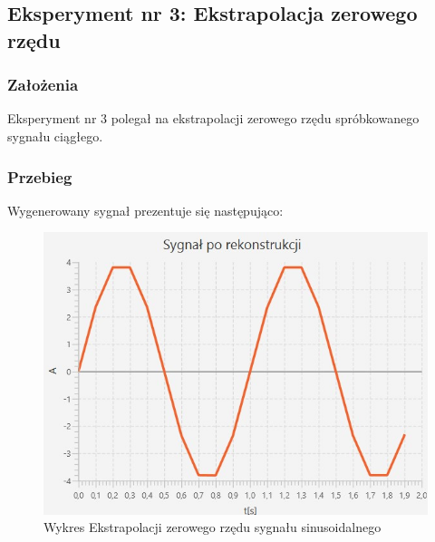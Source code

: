\documentclass[12pt]{article}
\begin{document}

\newpage
\subsection{Eksperyment nr 3: Ekstrapolacja zerowego rzędu}


\subsubsection{Założenia}
Eksperyment nr 3 polegał na ekstrapolacji zerowego rzędu spróbkowanego sygnału ciągłego.
\subsubsection{Przebieg}
Wygenerowany sygnał prezentuje się następująco:
\begin{figure}[H]
    \centering
	\includegraphics[width=\linewidth]{sygnal_rekonstrukcja_zero.jpg}
    \caption{Wykres Ekstrapolacji zerowego rzędu sygnału sinusoidalnego}
    \label{wykres dla eksperymentu 3}
\end{figure}
\end{document}
